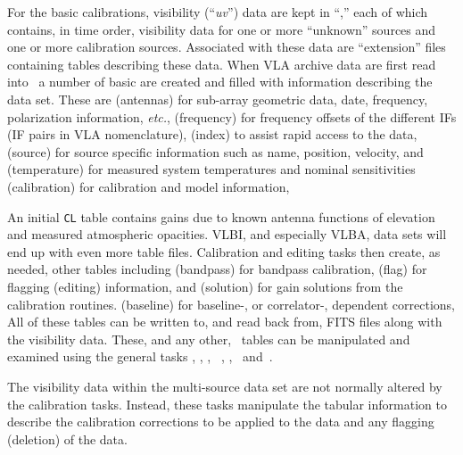      For the basic calibrations, visibility (``{\it uv\/}'') data are
kept in ``,'' each of which contains, in
time order, visibility data for one or more ``unknown'' sources and
one or more calibration sources.  Associated with these data are
``extension'' files containing tables describing these data.
  When VLA archive data are first read into
\AIPS\ a number of basic  are created and filled with
information describing the data set.  These are 
\xben
{} (antennas) for sub-array geometric data, date,
     frequency, polarization information, {\it etc.\/},
 (frequency) for frequency offsets of the different
     IFs (IF pairs in VLA nomenclature),
 (index) to assist rapid access to the data,
 (source) for source specific information such as
     name, position, velocity, and
 (temperature) for measured system temperatures and
     nominal sensitivities
 (calibration) for calibration and model information,
\xeen
\par\noindent An initial {\tt CL} table contains gains due to known
antenna functions of elevation and measured atmospheric opacities.
VLBI, and especially VLBA, data sets will end up with even more table
files.  Calibration and editing tasks then create, as needed, other
tables including
\xben
\setcounter{enumi}{6}
 (bandpass) for bandpass calibration,
 (flag) for flagging (editing) information, and
 (solution) for gain solutions from the calibration
     routines.
 (baseline) for baseline-, or correlator-,
     dependent corrections,
\xeen
\noindent All of these tables can be written to, and read back from,
FITS files along with the visibility data.  These, and any other,
\AIPS\ tables can be manipulated and examined using the general tasks
{\tt {}}, {\tt {}}, {\tt {}}, {\tt
{}}, {\tt {}}, \hbox{{\tt {}} and
{\tt {}}}.

     The visibility data within the multi-source data set are not
normally altered by the calibration tasks.  Instead, these tasks
manipulate the tabular information to describe the calibration
corrections to be applied to the data and any flagging (deletion) of
the data.

